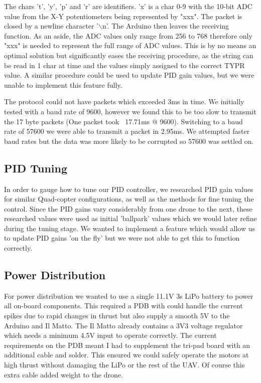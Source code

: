 \documentclass[a4paper,11pt]{article}
\begin{document}
The chars 't', 'y', 'p' and 'r' are identifiers. 'x' is a char 0-9 with the 10-bit ADC value from the X-Y potentiometers being represented by "xxx". The packet is closed by a newline character '$\backslash$n'. The Arduino then leaves the receiving function. As an aside, the ADC values only range from 256 to 768 therefore only "xxx" is needed to represent the full range of ADC values. This is by no means an optimal solution but significantly eases the receiving procedure, as the string can be read in 1 char at time and the values simply assigned to the correct TYPR value. A similar procedure could be used to update PID gain values, but we were unable to implement this feature fully.  

The protocol could not have packets which exceeded 3ms in time. We initially tested with a baud rate of 9600, however we found this to be too slow to transmit the 17 byte packets (One packet took ~17.71ms @ 9600). Switching to a baud rate of 57600 we were able to transmit a packet in 2.95ms. We attempted faster baud rates but the data was more likely to be corrupted so 57600 was settled on.
\subsection{PID Tuning}
In order to gauge how to tune our PID controller, we researched PID gain values for similar Quad-copter configurations, as well as the methods for fine tuning the control. Since the PID gains vary considerably from one drone to the next, these researched values were used as initial 'ballpark' values which we would later refine during the tuning stage. We wanted to implement a feature which would allow us to update PID gains 'on the fly' but we were not able to get this to function correctly.
\subsection{Power Distribution}
For power distribution we wanted to use a single 11.1V 3s LiPo battery to power all on-board components. This required a PDB with could handle the current spikes due to rapid changes in thrust but also supply a smooth 5V to the Arduino and Il Matto. The Il Matto already contains a 3V3 voltage regulator which needs a minimum 4.5V input to operate correctly. The current requirements on the PDB meant I had to supplement the tri-pad board with an additional cable and solder. This ensured we could safely operate the motors at high thrust without damaging the LiPo or the rest of the UAV. Of course this extra cable added weight to the drone. 
\end{document}
